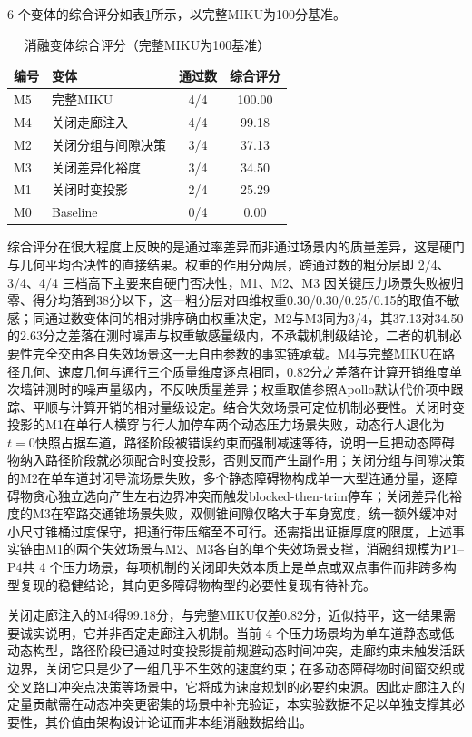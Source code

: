 \documentclass[a4paper,zihao=5]{ctexart}
\theoremstyle{definition}
\begin{document}
6 个变体的综合评分如表\ref{tab:exp_ablation_score}所示，以完整MIKU为100分基准。

\begin{table}[htbp]
\centering
\caption{消融变体综合评分（完整MIKU为100基准）}
\label{tab:exp_ablation_score}
\small
\begin{tabular}{llcc}
\toprule
\textbf{编号} & \textbf{变体} & \textbf{通过数} & \textbf{综合评分} \\
\midrule
M5 & 完整MIKU             & 4/4 & 100.00 \\
M4 & 关闭走廊注入         & 4/4 & 99.18 \\
M2 & 关闭分组与间隙决策   & 3/4 & 37.13 \\
M3 & 关闭差异化裕度       & 3/4 & 34.50 \\
M1 & 关闭时变投影         & 2/4 & 25.29 \\
M0 & Baseline             & 0/4 & 0.00 \\
\bottomrule
\end{tabular}
\end{table}

综合评分在很大程度上反映的是通过率差异而非通过场景内的质量差异，这是硬门与几何平均否决性的直接结果。权重的作用分两层，跨通过数的粗分层即 2/4、3/4、4/4 三档高下主要来自硬门否决性，M1、M2、M3 因关键压力场景失败被归零、得分均落到38分以下，这一粗分层对四维权重0.30/0.30/0.25/0.15的取值不敏感；同通过数变体间的相对排序确由权重决定，M2与M3同为3/4，其37.13对34.50的2.63分之差落在测时噪声与权重敏感量级内，不承载机制级结论，二者的机制必要性完全交由各自失效场景这一无自由参数的事实链承载。M4与完整MIKU在路径几何、速度几何与通行三个质量维度逐点相同，0.82分之差落在计算开销维度单次墙钟测时的噪声量级内，不反映质量差异；权重取值参照Apollo默认代价项中跟踪、平顺与计算开销的相对量级设定。结合失效场景可定位机制必要性。关闭时变投影的M1在单行人横穿与行人加停车两个动态压力场景失败，动态行人退化为$t=0$快照占据车道，路径阶段被错误约束而强制减速等待，说明一旦把动态障碍物纳入路径阶段就必须配合时变投影，否则反而产生副作用；关闭分组与间隙决策的M2在单车道封闭导流场景失败，多个静态障碍物构成单一大型连通分量，逐障碍物贪心独立选向产生左右边界冲突而触发blocked-then-trim停车；关闭差异化裕度的M3在窄路交通锥场景失败，双侧锥间隙仅略大于车身宽度，统一额外缓冲对小尺寸锥桶过度保守，把通行带压缩至不可行。还需指出证据厚度的限度，上述事实链由M1的两个失效场景与M2、M3各自的单个失效场景支撑，消融组规模为P1--P4共 4 个压力场景，每项机制的关闭即失效本质上是单点或双点事件而非跨多构型复现的稳健结论，其向更多障碍物构型的必要性复现有待补充。

关闭走廊注入的M4得99.18分，与完整MIKU仅差0.82分，近似持平，这一结果需要诚实说明，它并非否定走廊注入机制。当前 4 个压力场景均为单车道静态或低动态构型，路径阶段已通过时变投影提前规避动态时间冲突，走廊约束未触发活跃边界，关闭它只是少了一组几乎不生效的速度约束；在多动态障碍物时间窗交织或交叉路口冲突点决策等场景中，它将成为速度规划的必要约束源。因此走廊注入的定量贡献需在动态冲突更密集的场景中补充验证，本实验数据不足以单独支撑其必要性，其价值由架构设计论证而非本组消融数据给出。
\end{document}
